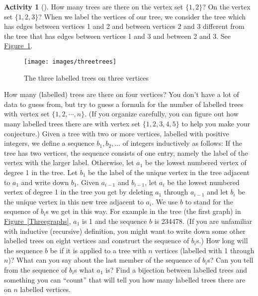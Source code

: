 \documentclass[10pt,]{book}
\theoremstyle{plain}
\theoremstyle{definition}
\newtheorem{activity}[project]{Activity}
\numberwithin{equation}{chapter}
\begin{document}
\begin{activity}[]\label{Prufer}
How many trees are there on the vertex set \(\{1,2\}\)? On the vertex set \(\{1,2,3\}\)? When we label the vertices of our tree, we consider the tree which has edges between vertices 1 and 2 and between vertices 2 and 3 different from the tree that has edges between vertices 1 and 3 and between 2 and 3. See \hyperref[differenttrees]{Figure~\ref{differenttrees}}.%
\begin{figure}
\centering
\texttt{[image: images/threetrees]}
\caption{The three labelled trees on three vertices\label{differenttrees}}
\end{figure}
How many (labelled) trees are there on four vertices? You don't have a lot of data to guess from, but try to guess a formula for the number of labelled trees with vertex set \(\{1,2,\cdots,n\}\). (If you organize carefully, you can figure out how many labelled trees there are with vertex set \(\{1,2,3,4,5\}\) to help you make your conjecture.) Given a tree with two or more vertices, labelled with positive integers, we define a sequence \(b_1,b_2,\ldots\) of integers inductively as follows: If the tree has two vertices, the sequence consists of one entry, namely the label of the vertex with the larger label. Otherwise, let \(a_1\) be the lowest numbered vertex of degree 1 in the tree. Let \(b_1\) be the label of the unique vertex in the tree adjacent to \(a_1\) and write down \(b_1\). Given \(a_{i-1}\) and \(b_{i-1}\), let \(a_i\) be the lowest numbered vertex of degree 1 in the tree you get by deleting \(a_1\) through \(a_{i-1}\) and let \(b_i\) be the unique vertex in this new tree adjacent to \(a_i\). We use \(b\) to stand for the sequence of \(b_i\)s we get in this way. For example in the tree (the first graph) in \hyperref[Threegraphs]{Figure~\ref{Threegraphs}}, \(a_1\) is 1 and the sequence \(b\) is 234478. (If you are unfamiliar with inductive (recursive) definition, you might want to write down some other labelled trees on eight vertices and construct the sequence of \(b_i\)s.) How long will the sequence \(b\) be if it is applied to a tree with \(n\) vertices (labelled with 1 through \(n\))? What can you say about the last member of the sequence of \(b_i\)s? Can you tell from the sequence of \(b_i\)s what \(a_1\) is? Find a bijection between labelled trees and something you can ``count'' that will tell you how many labelled trees there are on \(n\) labelled vertices.%
\par\medskip\noindent%

\end{activity}
\end{document}

